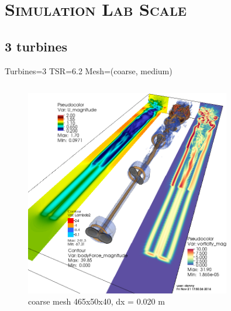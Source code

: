 \documentclass[xcolor=x11names,compress]{beamer}
\begin{document}
\section{\scshape Simulation Lab Scale}

\subsection{3 turbines}

	\begin{frame}{Turbines=3  TSR=6.2  Mesh=(coarse, medium)}
		
		\begin{columns}
		    
		    \begin{column}{0.6\textwidth}
		        \begin{figure}[p]
				    \centering
				    \includegraphics[width=0.8\textwidth]{figures/fastFlume__Turbines=3_TSR=6p2_Layout=offset_Mesh=coarse.png}
				    \caption{\scriptsize{coarse mesh 465x50x40, dx = 0.020 m}}
				\end{figure}

		    \end{column}
		    

\end{columns}
\end{frame}
\end{document}
